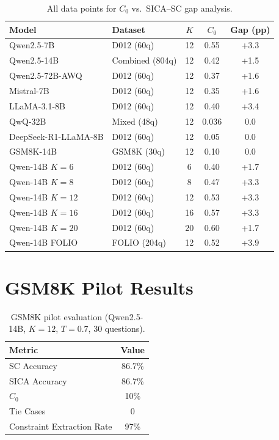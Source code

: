 \documentclass[11pt]{article}
\begin{document}
\begin{table}[h]
\centering
\caption{All data points for $C_0$ vs.\ SICA--SC gap analysis.}
\label{tab:c0_full}
\small
\begin{tabular}{@{}llccc@{}}
\toprule
Model & Dataset & $K$ & $C_0$ & Gap (pp) \\
\midrule
Qwen2.5-7B & D012 (60q) & 12 & 0.55 & +3.3 \\
Qwen2.5-14B & Combined (804q) & 12 & 0.42 & +1.5 \\
Qwen2.5-72B-AWQ & D012 (60q) & 12 & 0.37 & +1.6 \\
Mistral-7B & D012 (60q) & 12 & 0.35 & +1.6 \\
LLaMA-3.1-8B & D012 (60q) & 12 & 0.40 & +3.4 \\
QwQ-32B & Mixed (48q) & 12 & 0.036 & 0.0 \\
DeepSeek-R1-LLaMA-8B & D012 (60q) & 12 & 0.05 & 0.0 \\
GSM8K-14B & GSM8K (30q) & 12 & 0.10 & 0.0 \\
Qwen-14B $K{=}6$ & D012 (60q) & 6 & 0.40 & +1.7 \\
Qwen-14B $K{=}8$ & D012 (60q) & 8 & 0.47 & +3.3 \\
Qwen-14B $K{=}12$ & D012 (60q) & 12 & 0.53 & +3.3 \\
Qwen-14B $K{=}16$ & D012 (60q) & 16 & 0.57 & +3.3 \\
Qwen-14B $K{=}20$ & D012 (60q) & 20 & 0.60 & +1.7 \\
Qwen-14B FOLIO & FOLIO (204q) & 12 & 0.52 & +3.9 \\
\bottomrule
\end{tabular}
\end{table}

\section{GSM8K Pilot Results}
\label{app:gsm8k}

\begin{table}[h]
\centering
\caption{GSM8K pilot evaluation (Qwen2.5-14B, $K=12$, $T=0.7$, 30 questions).}
\label{tab:gsm8k}
\small
\begin{tabular}{@{}lc@{}}
\toprule
Metric & Value \\
\midrule
SC Accuracy & 86.7\% \\
SICA Accuracy & 86.7\% \\
$C_0$ & 10\% \\
Tie Cases & 0 \\
Constraint Extraction Rate & 97\% \\
\bottomrule
\end{tabular}
\end{table}
\end{document}
